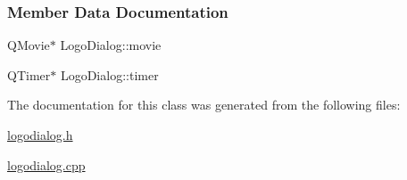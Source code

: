 \subsubsection{Member Data Documentation}
\mbox{\label{classLogoDialog_a45504b8a8b3fc44056859fcb708c2313}} 
{\footnotesize\ttfamily Q\+Movie$\ast$ Logo\+Dialog\+::\texorpdfstring{movie}{movie}\hspace{0.3cm}{\ttfamily [private]}}

\mbox{\label{classLogoDialog_a0f26a533559a0c055ac7ce2ec9d85273}} 
{\footnotesize\ttfamily Q\+Timer$\ast$ Logo\+Dialog\+::\texorpdfstring{timer}{timer}\hspace{0.3cm}{\ttfamily [private]}}

The documentation for this class was generated from the following files\+:\begin{DoxyCompactItemize}
\item 
\mbox{\hyperlink{logodialog_8h}{logodialog.\+h}}\item 
\mbox{\hyperlink{logodialog_8cpp}{logodialog.\+cpp}}\end{DoxyCompactItemize}
\newpage